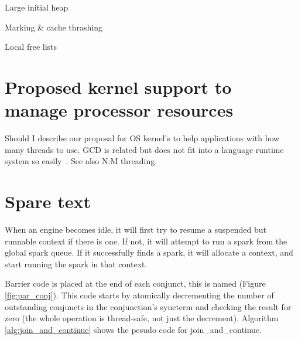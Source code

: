 Large initial heap

Marking \& cache thrashing

Local free lists

\section{Proposed kernel support to manage processor resources}

    
Should I describe our proposal for OS kernel's to help
applications with how many threads to use.
GCD is related but does not fit into a language runtime system so
easily~\cite{apple_gcd}.
See also N:M threading.

\section{Spare text}


%
%

When an engine becomes idle, it will first try
to resume a suspended but runnable context if there is one.
If not, it will attempt to run a spark from the global spark queue.
If it successfully finds a spark, it will allocate a context,
and start running the spark in that context.


Barrier code is placed at the end of each conjunct,
this is named  (Figure \ref{fig:par_conj}).
This code starts by atomically decrementing the number of outstanding
conjuncts in the conjunction's syncterm and checking the result for zero
(the whole operation is thread-safe, not just the decrement).
Algorithm \ref{alg:join_and_continue} shows the pesudo code for
join\_and\_continue.

